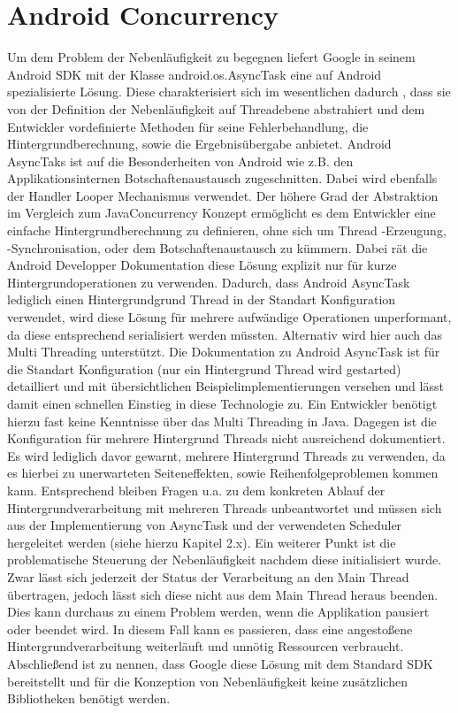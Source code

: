 \documentclass[12pt,oneside,a4paper,bibtotoc,liststotoc]{scrreprt}
\begin{document}
\section{Android Concurrency}
Um dem Problem der Nebenläufigkeit zu begegnen liefert Google in seinem Android SDK mit der Klasse android.os.AsyncTask eine auf Android spezialisierte Lösung. Diese charakterisiert sich im wesentlichen dadurch , dass sie von der Definition der Nebenläufigkeit auf Threadebene abstrahiert und dem Entwickler vordefinierte Methoden für seine Fehlerbehandlung, die Hintergrundberechnung, sowie die Ergebnisübergabe anbietet. Android AsyncTaks ist auf die Besonderheiten von Android wie z.B. den Applikationsinternen Botschaftenaustausch zugeschnitten. Dabei wird ebenfalls der Handler Looper Mechanismus verwendet. Der höhere Grad der Abstraktion im Vergleich zum JavaConcurrency Konzept ermöglicht es dem Entwickler eine einfache Hintergrundberechnung zu definieren, ohne sich um Thread -Erzeugung, -Synchronisation, oder dem Botschaftenaustausch zu kümmern. Dabei rät die Android Developper Dokumentation diese Lösung explizit nur für kurze Hintergrundoperationen zu verwenden. Dadurch, dass Android AsyncTask lediglich einen Hintergrundgrund Thread in der Standart Konfiguration verwendet, wird diese Lösung für mehrere aufwändige Operationen unperformant, da diese entsprechend serialisiert werden müssten. Alternativ wird hier auch das Multi Threading unterstützt. Die Dokumentation zu Android AsyncTask ist für die Standart Konfiguration (nur ein Hintergrund Thread wird gestarted) detailliert und mit übersichtlichen Beispielimplementierungen versehen und lässt damit einen  schnellen Einstieg in diese Technologie zu. Ein Entwickler benötigt hierzu fast keine Kenntnisse über das Multi Threading in Java. Dagegen ist die Konfiguration für mehrere Hintergrund Threads nicht ausreichend dokumentiert. Es wird lediglich davor gewarnt, mehrere Hintergrund Threads zu verwenden, da es hierbei zu unerwarteten Seiteneffekten, sowie Reihenfolgeproblemen kommen kann. Entsprechend bleiben Fragen u.a. zu dem konkreten Ablauf der Hintergrundverarbeitung mit mehreren Threads unbeantwortet und müssen sich aus der Implementierung von AsyncTask und der verwendeten Scheduler hergeleitet werden (siehe hierzu Kapitel 2.x).\newline
Ein weiterer Punkt ist die problematische Steuerung der Nebenläufigkeit nachdem diese initialisiert wurde. Zwar lässt sich jederzeit der Status der Verarbeitung an den Main Thread übertragen, jedoch lässt sich diese nicht aus dem Main Thread heraus beenden. Dies kann durchaus zu einem Problem werden, wenn die Applikation pausiert oder beendet wird. In diesem Fall kann es passieren, dass eine angestoßene Hintergrundverarbeitung weiterläuft und unnötig Ressourcen verbraucht.\newline
Abschließend ist zu nennen, dass Google diese Lösung mit dem Standard SDK bereitstellt und für die Konzeption von Nebenläufigkeit keine zusätzlichen Bibliotheken benötigt werden.
\end{document}
